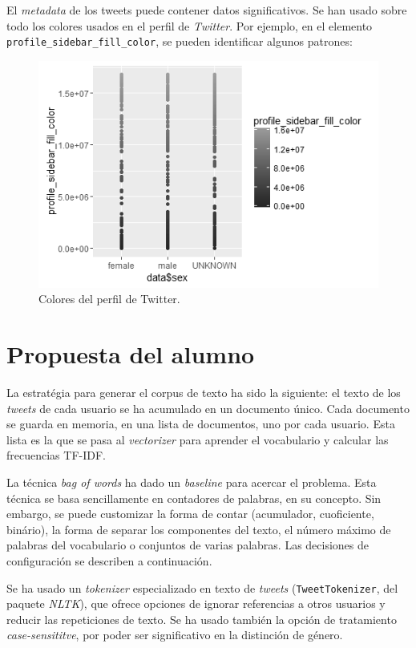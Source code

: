 \documentclass[11pt,a4paper]{article}
\begin{document}
  El {\em metadata} de los tweets puede contener datos significativos. Se han usado sobre todo los colores usados en el perfil de {\em Twitter}. Por ejemplo, en el elemento {\tt profile\_sidebar\_fill\_color}, se pueden identificar algunos patrones:
   
  \begin{figure}[ht!]
    \includegraphics[width=\linewidth]{profile_colors.png}
    \caption{Colores del perfil de Twitter.}
    \label{fig:profile_colors}
  \end{figure}
  

\section{Propuesta del alumno}

  La estrat\'egia para generar el corpus de texto ha sido la siguiente: el texto de los {\em tweets} de cada usuario se ha acumulado en un documento \'unico. Cada documento se guarda en memoria, en una lista de documentos, uno por cada usuario. Esta lista es la que se pasa al {\em vectorizer} para aprender el vocabulario y calcular las frecuencias TF-IDF.

  La t\'ecnica {\em bag of words} ha dado un {\em baseline} para acercar el problema. Esta t\'ecnica se basa sencillamente en contadores de palabras, en su concepto. Sin embargo, se puede customizar la forma de contar (acumulador, cuoficiente, bin\'ario), la forma de separar los componentes del texto, el n\'umero m\'aximo de palabras del vocabulario o conjuntos de varias palabras. Las decisiones de configuraci\'on se describen a continuaci\'on.

  Se ha usado un {\em tokenizer} especializado en texto de {\em tweets} ({\tt TweetTokenizer}, del paquete {\em NLTK}), que ofrece opciones de ignorar referencias a otros usuarios y reducir las repeticiones de texto. Se ha usado tambi\'en la opci\'on de tratamiento {\em case-sensititve}, por poder ser significativo en la distinci\'on de g\'enero.
\end{document}
